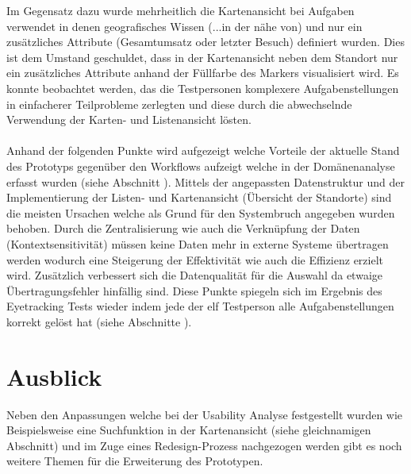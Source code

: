 \documentclass[Bachelorarbeit.tex]{subfiles}
\begin{document}
Im Gegensatz dazu wurde mehrheitlich die Kartenansicht bei Aufgaben verwendet in denen geografisches Wissen (...in der nähe von) und nur ein zusätzliches Attribute (Gesamtumsatz oder letzter Besuch) definiert wurden.
Dies ist dem Umstand geschuldet, dass in der Kartenansicht neben dem Standort nur ein zusätzliches Attribute anhand der Füllfarbe des Markers visualisiert wird.
Es konnte beobachtet werden, das die Testpersonen komplexere Aufgabenstellungen in einfacherer Teilprobleme zerlegten und diese durch die abwechselnde Verwendung der Karten- und Listenansicht lösten.\\
\\
Anhand der folgenden Punkte wird aufgezeigt welche Vorteile der aktuelle Stand des Prototyps gegenüber den Workflows aufzeigt welche in der Domänenanalyse erfasst wurden (siehe Abschnitt ).
Mittels der angepassten Datenstruktur und der Implementierung der Listen- und Kartenansicht (Übersicht der Standorte) sind die meisten Ursachen welche als Grund für den Systembruch angegeben wurden behoben.
Durch die Zentralisierung wie auch die Verknüpfung der Daten (Kontextsensitivität) müssen keine Daten mehr in externe Systeme übertragen werden wodurch eine Steigerung der Effektivität wie auch die Effizienz erzielt wird.
Zusätzlich verbessert sich die Datenqualität für die Auswahl da etwaige Übertragungsfehler hinfällig sind.
Diese Punkte spiegeln sich im Ergebnis des Eyetracking Tests wieder indem jede der elf Testperson alle Aufgabenstellungen korrekt gelöst hat (siehe Abschnitte ).

\section{Ausblick}
\label{chap:reflexion:sec:ausblick}

Neben den Anpassungen welche bei der Usability Analyse festgestellt wurden wie Beispielsweise eine Suchfunktion in der Kartenansicht (siehe gleichnamigen Abschnitt) und im Zuge eines Redesign-Prozess nachgezogen werden gibt es noch weitere Themen für die Erweiterung des Prototypen.
\end{document}
